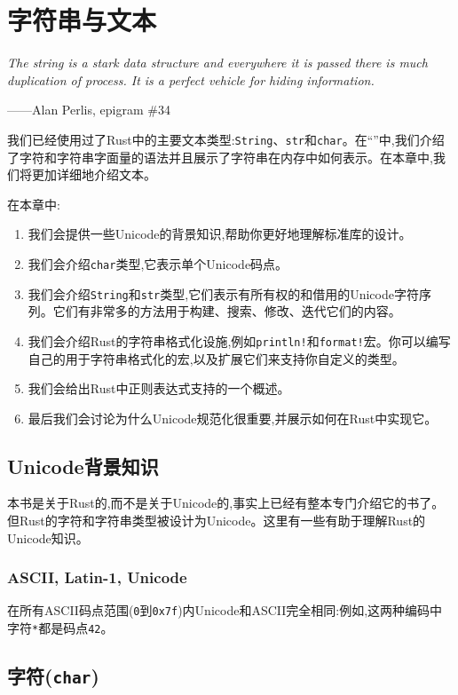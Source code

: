 \chapter{字符串与文本}\label{ch17}

\emph{The string is a stark data structure and everywhere it is passed there is much duplication of process. It is a perfect vehicle for hiding information.}
\begin{flushright}
    ——Alan Perlis, epigram \#34
\end{flushright}

我们已经使用过了Rust中的主要文本类型:\texttt{String}、\texttt{str}和\texttt{char}。在“”中,我们介绍了字符和字符串字面量的语法并且展示了字符串在内存中如何表示。在本章中,我们将更加详细地介绍文本。

在本章中:
\begin{enumerate}
    \item 我们会提供一些Unicode的背景知识,帮助你更好地理解标准库的设计。
    \item 我们会介绍\texttt{char}类型,它表示单个Unicode码点。
    \item 我们会介绍\texttt{String}和\texttt{str}类型,它们表示有所有权的和借用的Unicode字符序列。它们有非常多的方法用于构建、搜索、修改、迭代它们的内容。
    \item 我们会介绍Rust的字符串格式化设施,例如\texttt{println!}和\texttt{format!}宏。你可以编写自己的用于字符串格式化的宏,以及扩展它们来支持你自定义的类型。
    \item 我们会给出Rust中正则表达式支持的一个概述。
    \item 最后我们会讨论为什么Unicode规范化很重要,并展示如何在Rust中实现它。
\end{enumerate}

\section{Unicode背景知识}

本书是关于Rust的,而不是关于Unicode的,事实上已经有整本专门介绍它的书了。但Rust的字符和字符串类型被设计为Unicode。这里有一些有助于理解Rust的Unicode知识。

\subsection{ASCII, Latin-1, Unicode}
在所有ASCII码点范围(\texttt{0}到\texttt{0x7f})内Unicode和ASCII完全相同:例如,这两种编码中字符\texttt{*}都是码点\texttt{42}。

\section{字符(\texttt{char})}

